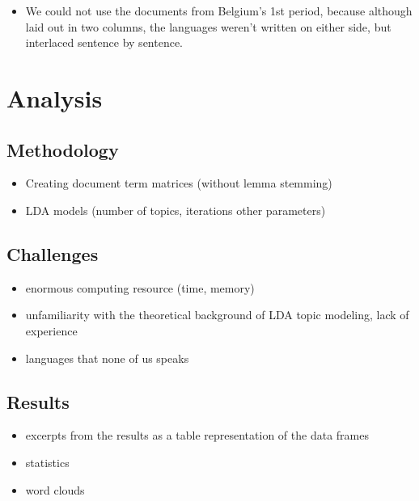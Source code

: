 \documentclass[
  12pt,
]{scrreprt}
\providecommand{\tightlist}{%
  \setlength{\itemsep}{0pt}\setlength{\parskip}{0pt}}
\begin{document}
\begin{itemize}
\tightlist
\item
  We could not use the documents from Belgium's 1st period, because
  although laid out in two columns, the languages weren't written on
  either side, but interlaced sentence by sentence.
\end{itemize}

\hypertarget{analysis}{%
\chapter{Analysis}\label{analysis}}

\hypertarget{methodology}{%
\section{Methodology}\label{methodology}}

\begin{itemize}
\tightlist
\item
  Creating document term matrices (without lemma stemming)
\item
  LDA models (number of topics, iterations other parameters)
\end{itemize}

\hypertarget{challenges-1}{%
\section{Challenges}\label{challenges-1}}

\begin{itemize}
\tightlist
\item
  enormous computing resource (time, memory)
\item
  unfamiliarity with the theoretical background of LDA topic modeling,
  lack of experience
\item
  languages that none of us speaks
\end{itemize}

\hypertarget{results}{%
\section{Results}\label{results}}

\begin{itemize}
\tightlist
\item
  excerpts from the results as a table representation of the data frames
\item
  statistics
\item
  word clouds
\end{itemize}
\end{document}
